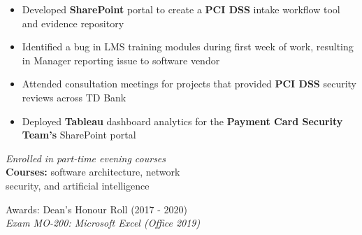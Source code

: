 \documentclass[10pt,a4paper,ragged2e,withhyper]{altacv}
\begin{document}
\begin{paracol}{2}
        \medskip
        
        \begin{itemize}
            \item Developed \textbf{SharePoint} portal to create a \textbf{PCI DSS} intake workflow tool and evidence repository
            \item Identified a bug in LMS training modules during first week of work, resulting in Manager reporting issue to software vendor 
            \item Attended consultation meetings for projects that provided \textbf{PCI DSS} security reviews across TD Bank
            \item Deployed \textbf{Tableau} dashboard analytics for the \textbf{Payment Card Security Team's} SharePoint portal
    
        \end{itemize}
        
        \medskip
        
        \newpage
        
        \switchcolumn
        
        
        \textit{Enrolled in part-time evening courses}\\
        \medskip
        \textbf{Courses:} software architecture, network\\ security, and artificial intelligence\\
        
        \divider
        
        Awards: Dean's Honour Roll (2017 - 2020)\\
        
        \medskip
        \textit{Exam MO-200: Microsoft Excel (Office 2019)}\\
        \medskip
        

\end{paracol}
\end{document}
